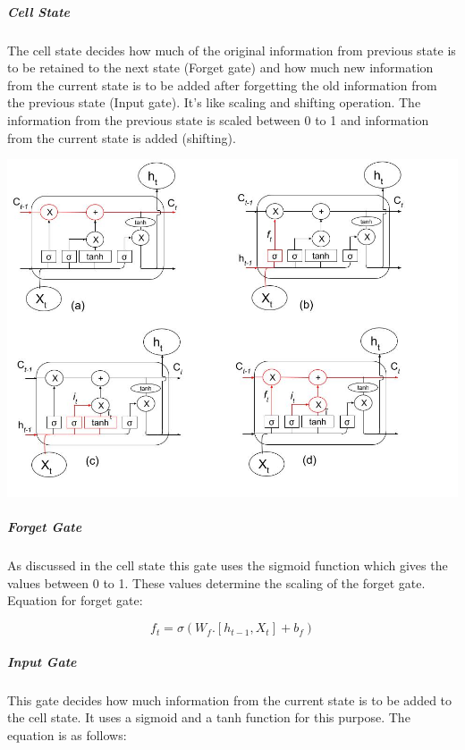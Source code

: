 \subparagraph{Cell State}

The cell state decides how much of the original information from previous state is to be retained to the next state (Forget gate) and how much new information from the current state is to be added after forgetting the old information from the previous state (Input gate). It's like scaling and shifting operation. The information from the previous state is scaled between 0 to 1 and information from the current state is added (shifting).

				\begin{center}
				\includegraphics[width=\linewidth]{figures/fig-c-f-i-u.jpg}	
				\label{fig: Flow of input through various gates. (a) Cell State, (b) Forget gate, (c) Input Gate and (d) Update to New Cell State}
				\end{center}

\subparagraph{Forget Gate}

As discussed in the cell state this gate uses the sigmoid function which gives the values between 0 to 1. These values determine the scaling of the forget gate.
Equation for forget gate:

\begin{equation}
	f_{t} = \sigma (W_{f} . [h_{t-1}, X_{t}] + b_{f})	
\end{equation}


\subparagraph{Input Gate}

This gate decides how much information from the current state is to be added to the cell state. It uses a sigmoid and a tanh function for this purpose. The equation is as follows:

